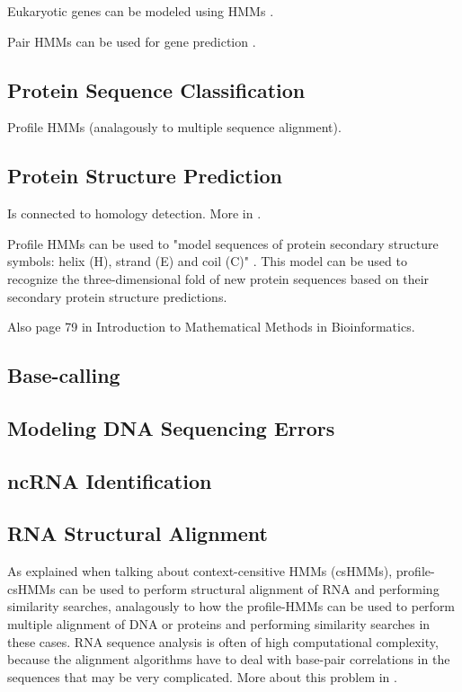 \documentclass{article}
\begin{document}
Eukaryotic genes can be modeled using HMMs \cite{Yoon2009}. 

Pair HMMs can be used for gene prediction \cite{Yoon2009}.


\subsection{Protein Sequence Classification}

Profile HMMs (analagously to multiple sequence alignment). 


\subsection{Protein Structure Prediction}
Is connected to homology detection. More in \cite{Choo2004}.

Profile HMMs can be used to "model sequences of protein secondary structure symbols: helix (H), strand (E) and coil (C)" \cite{Yoon2009}. This model can be used to recognize the three-dimensional fold of new protein sequences based on their secondary protein structure predictions. 

Also page 79 in Introduction to Mathematical Methods in Bioinformatics. 


\subsection{Base-calling}
\cite{Yoon2009}
\subsection{Modeling DNA Sequencing Errors}
\cite{Yoon2009}
\subsection{ncRNA Identification}
\cite{Yoon2009}
\subsection{RNA Structural Alignment}
As explained when talking about context-censitive HMMs (csHMMs), profile-csHMMs can be used to perform structural alignment of RNA and performing similarity searches, analagously to how the profile-HMMs can be used to perform multiple alignment of DNA or proteins and performing similarity searches in these cases. RNA sequence analysis is often of high computational complexity, because the alignment algorithms have to deal with base-pair correlations in the sequences that may be very complicated. More about this problem in \cite{Yoon2009}.
\end{document}
